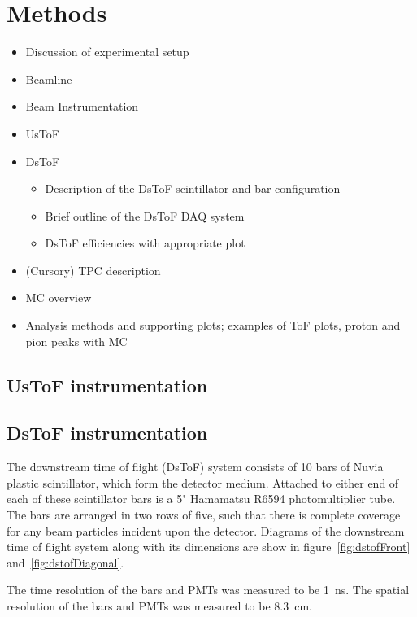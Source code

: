 \section{Methods}
\label{hptpcPaper:sec:Methods}
\begin{itemize}
    \item Discussion of experimental setup
\item Beamline
\item Beam Instrumentation
\item UsToF
\item DsToF
    \begin{itemize}
        \item Description of the DsToF scintillator and bar configuration 
        \item Brief outline of the DsToF DAQ system
        \item DsToF efficiencies with appropriate plot
    \end{itemize}

\item (Cursory) TPC description
\item MC overview
\item Analysis methods and supporting plots; examples of ToF plots, proton and pion peaks with MC

\end{itemize}

	\subsection{UsToF instrumentation}

	\subsection{DsToF instrumentation}
	
    The downstream time of flight (DsToF) system consists of 10 bars of Nuvia plastic scintillator, which form the detector medium. Attached to either end of each of these scintillator bars is a 5" Hamamatsu R6594 photomultiplier tube. The bars are arranged in two rows of five, such that there is complete coverage for any beam particles incident upon the detector. Diagrams of the downstream time of flight system along with its dimensions are show in figure~\ref{fig:dstofFront} and~\ref{fig:dstofDiagonal}.
    
    The time resolution of the bars and PMTs was measured to be 1~ns. The spatial resolution of the bars and PMTs was measured to be 8.3~cm.
    
